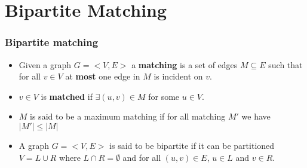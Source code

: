 \documentclass{beamer}
\begin{document}
\section{Bipartite Matching}
\begin{frame}
  \frametitle{Bipartite matching}

  \begin{itemize}
    \item Given a graph $G=<V,E>$  a \textbf{matching} is a set of edges $M\subseteq E$ such that for all $v\in V$ at \textbf{most} one edge in $M$ is incident on $v$.
    \item $v\in V$ is \textbf{matched} if $\exists (u,v)\in M$ for some $u\in V$.
    \item $M$ is said to be a maximum matching if for all matching $M'$  we have $|M'|\le |M|$
    \item A graph $G=<V,E>$ is said to be bipartite if it can be partitioned $V=L\cup R$ where $L\cap R=\emptyset$ and for all $(u,v)\in E$, $u\in L$ and $v\in R$.
  \end{itemize}

\end{frame}
\end{document}
